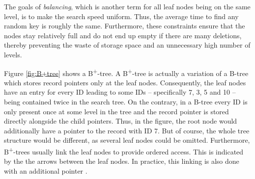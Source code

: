 The goals of \emph{balancing}, which is another term for all leaf nodes being on the same level, is to make the search speed uniform. Thus, the average time to find any random key is roughly the same. Furthermore, these constraints ensure that the nodes stay relatively full and do not end up empty if there are many deletions, thereby preventing the waste of storage space and an unnecessary high number of levels.\par 
Figure \ref{fig:B+tree} shows a B\textsuperscript{+}-tree. A B\textsuperscript{+}-tree is actually a variation of a B-tree which stores record pointers only at the leaf nodes. Consequently, the leaf nodes have an entry for every ID leading to some IDs -- specifically 7, 3, 5 and 10 -- being contained twice in the search tree. On the contrary, in a B-tree every ID is only present once at some level in the tree and the record pointer is stored directly alongside the child pointers. Thus, in the figure, the root node would additionally have a pointer to the record with ID 7. But of course, the whole tree structure would be different, as several leaf nodes could be omitted. Furthermore, B\textsuperscript{+}-trees usually link the leaf nodes to provide ordered access. This is indicated by the the arrows between the leaf nodes. In practice, this linking is also done with an additional pointer \cite{DatabaseFundamentals}.\\

